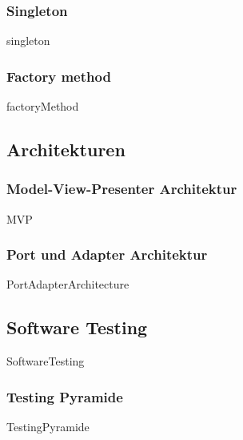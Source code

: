 \documentclass{article}
\begin{document}
        \subsubsection{Singleton}
        \label{kap:gof:singleton}
            {singleton}

        \subsubsection{Factory method}
        \label{kap:gof:factory}
            {factoryMethod}
            

    \newpage
    \subsection{Architekturen}
        \subsubsection{Model-View-Presenter Architektur}
        \label{kap:MVP}
            {MVP}
        
        \newpage
        \subsubsection{Port und Adapter Architektur}
        \label{kap:PortAdapterArchitecture}
            {PortAdapterArchitecture}


    \newpage
    \subsection{Software Testing}
        \nocite{Testing}
        {SoftwareTesting}

        \subsubsection{Testing Pyramide}
        \label{kap:testingPyramide}
            {TestingPyramide}
        
\end{document}
